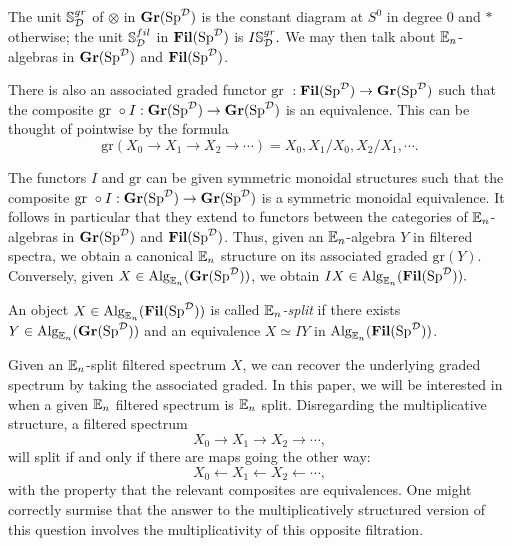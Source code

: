 The unit $\mathbb{S}^{gr}_{\D}$ of $\otimes$ in $\Gr(\Sp^{\D})$ is the constant diagram at $S^0$ in degree 0 and $*$ otherwise; the unit $\mathbb{S}^{fil}_{\D}$ in $\Fil(\Sp^{\D})$ is $I\mathbb{S}^{gr}_{\D}.$  We may then talk about $\E_n$-algebras in $\Gr(\Sp^{\D})$ and $\Fil(\Sp^{\D})$.  



There is also an associated graded functor $\text{gr }: \Fil(\Sp^{\D}) \to \Gr(\Sp^{\D})$ such that the composite $\text{gr }\circ I : \Gr(\Sp^{\D}) \to \Gr(\Sp^{\D})$ is an equivalence.   This can be thought of pointwise by the formula $$\text{gr}(X_0\to X_1\to X_2\to \cdots) = X_0, X_1/X_0, X_2/X_1, \cdots.$$




The functors $I$ and $\text{gr}$ can be given symmetric monoidal structures such that the composite $\text{gr }\circ I : \Gr(\Sp^{\D}) \to \Gr(\Sp^{\D})$ is a symmetric monoidal equivalence.  It follows in particular that they extend to functors between the categories of $\E_n$-algebras in $\Gr(\Sp^{\D})$ and $\Fil(\Sp^{\D})$.  Thus, given an $\E_n$-algebra $Y$ in filtered spectra, we obtain a canonical $\E_n$ structure on its associated graded $\text{gr}(Y).$  Conversely, given $X\in \Alg_{\E_n}(\Gr(\Sp^{\D}))$, we obtain $IX\in \Alg_{\E_n}(\Fil(\Sp^{\D})).$  

\begin{dfn}
An object $X\in \Alg_{\E_n}(\Fil(\Sp^{\D}))$ is called \emph{$\E_n$-split} if there exists $Y\in \Alg_{\E_n}(\Gr(\Sp^{\D}))$ and an equivalence $X \simeq IY$ in $\Alg_{\E_n}(\Fil(\Sp^{\D}))$.  
\end{dfn}

Given an $\E_n$-split filtered spectrum $X$, we can recover the underlying graded spectrum by taking the associated graded.  In this paper, we will be interested in when a given $\E_n$ filtered spectrum is $\E_n$ split.  Disregarding the multiplicative structure, a filtered spectrum $$X_0\longrightarrow X_1 \longrightarrow X_2 \longrightarrow \cdots ,$$ will split if and only if there are maps going the other way: $$X_0 \longleftarrow X_1 \longleftarrow X_2 \longleftarrow \cdots,$$ with the property that the relevant composites are equivalences.  One might correctly surmise that the answer to the multiplicatively structured version of this question involves the multiplicativity of this opposite filtration.  %


